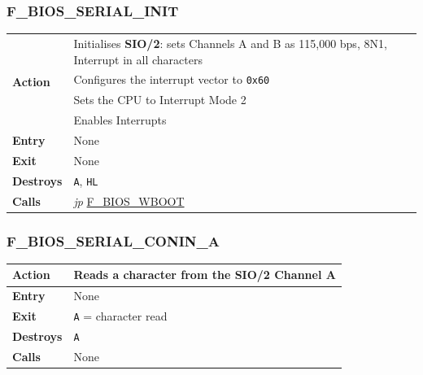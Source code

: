 \documentclass[a4paper,11pt]{article}
\begin{document}
        \subsubsection{F\_BIOS\_SERIAL\_INIT}
        \label{func:fbiosserialinit}
        \begin{tabular}{l p{9cm}}
            \hline\multirow[t]{4}{4em}{\textbf{Action}}
            & Initialises \textbf{SIO/2}: sets Channels A and B as 115,000 bps, 
            8N1, Interrupt in all characters \\
            & Configures the interrupt vector to \texttt{0x60} \\
            & Sets the CPU to Interrupt Mode 2 \\
            & Enables Interrupts \\
            \hline\textbf{Entry} & None \\
            \hline\textbf{Exit} & None \\
            \hline\textbf{Destroys} & \texttt{A}, \texttt{HL} \\
            \hline\textbf{Calls} 
            & \textit{jp} \hyperref[func:fbioswboot]{F\_BIOS\_WBOOT} \\
            \hline
        \end{tabular}
        
        \subsubsection{F\_BIOS\_SERIAL\_CONIN\_A}
        \label{func:fbiosserialconina}
        \begin{tabular}{l p{9cm}}
            \hline\textbf{Action}
            & Reads a character from the \textbf{SIO/2} Channel A \\
            \hline\textbf{Entry} & None \\
            \hline\textbf{Exit} & \texttt{A} = character read \\
            \hline\textbf{Destroys} & \texttt{A} \\
            \hline\textbf{Calls} & None \\
            \hline
        \end{tabular}
\end{document}
